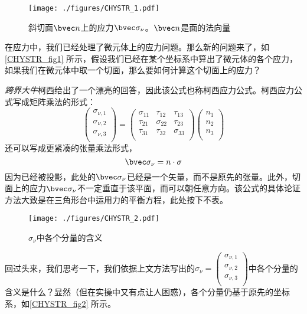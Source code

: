 

\begin{figure}[ht]
\centering
\texttt{[image: ./figures/CHYSTR\_1.pdf]}
\caption{斜切面$\bvec n$上的应力$\bvec \sigma_\nu$。$\bvec n$是面的法向量} \label{CHYSTR_fig1}
\end{figure}

在应力中，我们已经处理了微元体上的应力问题。那么新的问题来了，如\autoref{CHYSTR_fig1} 所示，假设我们已经在某个坐标系中算出了微元体的各个应力，如果我们在微元体中取一个切面，那么要如何计算这个切面上的应力？

\textsl{跨界大牛}柯西给出了一个漂亮的回答，因此该公式也称柯西应力公式。柯西应力公式写成矩阵乘法的形式：
\begin{equation}
\begin{pmatrix}
\sigma_{\nu,1}\\
\sigma_{\nu,2}\\
\sigma_{\nu,3}\\
\end{pmatrix}
=
\begin{pmatrix}
\sigma_{11} & \tau_{12} & \tau_{13} \\
\tau_{21} & \sigma_{22} & \tau_{23} \\
\tau_{31} & \tau_{32} & \sigma_{33} \\
\end{pmatrix}
\begin{pmatrix}
n_1\\
n_2\\
n_3\\
\end{pmatrix}
\end{equation}
还可以写成更紧凑的张量乘法形式，
\begin{equation}
\bvec \sigma_\nu = n \cdot \sigma
\end{equation}
因为已经被投影，此处的$\bvec \sigma_\nu$已经是一个矢量，而不是原先的张量。此外，切面上的应力$\bvec \sigma_\nu$不一定垂直于该平面，而可以朝任意方向。该公式的具体论证方法大致是在三角形台中运用力的平衡方程，此处按下不表。

\begin{figure}[ht]
\centering
\texttt{[image: ./figures/CHYSTR\_2.pdf]}
\caption{$\sigma_\nu$中各个分量的含义} \label{CHYSTR_fig2}
\end{figure}

回过头来，我们思考一下，我们依据上文方法写出的$\sigma_\nu=
\begin{pmatrix}
\sigma_{\nu,1}\\
\sigma_{\nu,2}\\
\sigma_{\nu,3}\\
\end{pmatrix}$中各个分量的含义是什么？显然（但在实操中又有点让人困惑），各个分量仍基于原先的坐标系，如\autoref{CHYSTR_fig2} 所示。

